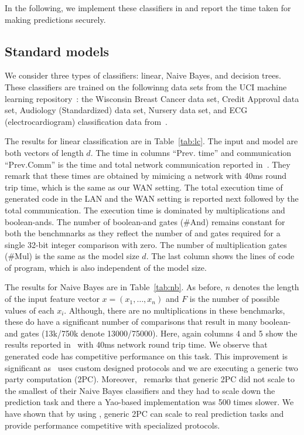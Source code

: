 In the following, we implement these classifiers in \tool and report the time taken for making predictions securely.

\subsection{Standard models}
\label{sec:shallow}
We consider three types of classifiers: linear, Naive Bayes, and decision trees. 
These classifiers are trained on the followinng data sets from the UCI  machine learning repository~\cite{uci}:
 the Wisconsin Breast Cancer data set, 
Credit Approval data set, Audiology (Standardized) data set, Nursery data set, and
ECG (electrocardiogram) classification data from~\cite{barni}.

The results for linear classification are in Table~\ref{tab:lc}. The input and model are both vectors of length $d$. The time in columns ``Prev. time'' and communication ``Prev.Comm'' is the time and total network communication reported in~\cite{shafindss}. They remark that these times are obtained by mimicing a network with 40ms round trip time, which is the same as our WAN setting. The total execution time of \tool generated code in the LAN and the WAN setting is reported next followed by the total communication.
The execution time is dominated by multiplications and boolean-ands.
The number of boolean-and gates (\#And) remains constant for both the benchmnarks as they reflect the number of and gates required for a single 32-bit integer comparison with zero. The number of multiplication gates (\#Mul) is the same as the model size $d$. The last column shows the lines of code of \tool program, which is also independent of the model size.

The results for Naive Bayes are in Table~\ref{tab:nb}. As before, $n$ denotes the length of the input feature vector $x=(x_1,\ldots,x_n)$ and $F$ is the number of possible values of each $x_i$.
Although, there are no multiplications in these benchmarks, these do have a significant number of comparisons that result in many boolean-and gates (13k/750k denote 13000/75000). 
Here, again columns 4 and 5 show the results reported in~\cite{shafindss} with 40ms network round trip time. We observe that \tool generated code has competitive performance on this task. This improvement is significant as~\cite{shafindss} uses custom designed protocols and we are executing a generic two party computation (2PC). Moreover,~\cite{shafindss} remarks that generic 2PC did not scale to the smallest of their Naive Bayes classifiers and they had to scale down the prediction task and there a Yao-based implementation was 500 times slower. We have shown that by using \tool, generic 2PC can scale to real prediction tasks and provide performance competitive with specialized protocols. 

